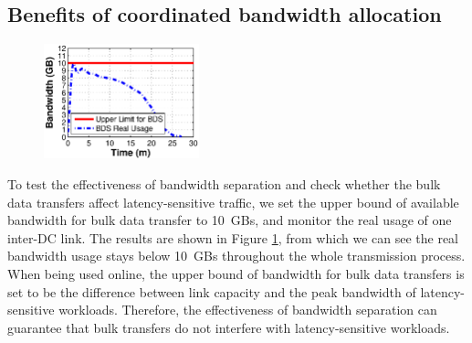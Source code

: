 
\subsection{Benefits of coordinated bandwidth allocation}
\label{subsec:evaluation:separation}
\begin{figure}[t]
  \centering
  \includegraphics[width=45mm]{images/Quota_v2.eps}%
  \label{fig:quota}
\vspace{-0.2cm}
\end{figure}

To test the effectiveness of bandwidth separation and check whether the bulk data transfers affect latency-sensitive traffic, we set the upper bound of available bandwidth for bulk data transfer to 10~GBs, and monitor the real usage of one inter-DC link. The results are shown in Figure \ref{fig:quota}, from which we can see the real bandwidth usage stays below 10~GBs throughout the whole transmission process.
When being used online, the upper bound of bandwidth for bulk data transfers is set to be the difference between link capacity and the peak bandwidth of latency-sensitive workloads. Therefore, the effectiveness of \name bandwidth separation can guarantee that bulk transfers do not interfere with latency-sensitive workloads.%

